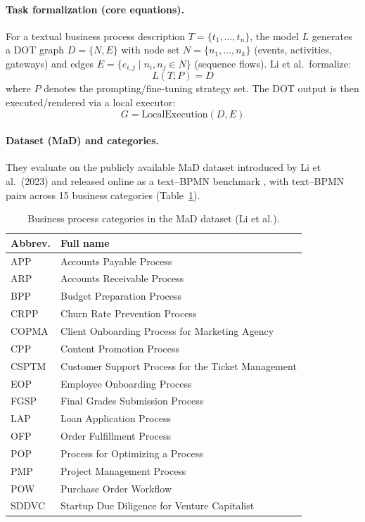 \paragraph{Task formalization (core equations).}
For a textual business process description $T=\{t_1,\dots,t_n\}$, the model $L$ generates a DOT graph
$D=\{N,E\}$ with node set $N=\{n_1,\dots,n_k\}$ (events, activities, gateways) and edges
$E=\{e_{i,j}\mid n_i,n_j\in N\}$ (sequence flows). Li et al.\ formalize: \cite{li-etal-2025-llm-based-business}
\begin{equation}
L(T;P)=D
\end{equation}
where $P$ denotes the prompting/fine-tuning strategy set. The DOT output is then executed/rendered via a local executor:
\begin{equation}
G=\mathrm{LocalExecution}(D,E)
\end{equation}

\paragraph{Dataset (MaD) and categories.}
They evaluate on the publicly available MaD dataset introduced by Li et al.\ (2023)
and released online as a text--BPMN benchmark \cite{li-etal-2023-mad,li-etal-2023-mad-data},
with text--BPMN pairs across 15 business categories (Table~\ref{tab:li2025-mad-categories}). \cite{li-etal-2025-llm-based-business}


\begin{table}[t]
\centering
\small
\setlength{\tabcolsep}{5pt}
\renewcommand{\arraystretch}{1.12}
\begin{tabular}{@{}ll@{}}
\toprule
\textbf{Abbrev.} & \textbf{Full name} \\
\midrule
APP   & Accounts Payable Process \\
ARP   & Accounts Receivable Process \\
BPP   & Budget Preparation Process \\
CRPP  & Churn Rate Prevention Process \\
COPMA & Client Onboarding Process for Marketing Agency \\
CPP   & Content Promotion Process \\
CSPTM & Customer Support Process for the Ticket Management \\
EOP   & Employee Onboarding Process \\
FGSP  & Final Grades Submission Process \\
LAP   & Loan Application Process \\
OFP   & Order Fulfillment Process \\
POP   & Process for Optimizing a Process \\
PMP   & Project Management Process \\
POW   & Purchase Order Workflow \\
SDDVC & Startup Due Diligence for Venture Capitalist \\
\bottomrule
\end{tabular}
\caption{Business process categories in the MaD dataset (Li et al.).}
\label{tab:li2025-mad-categories}
\end{table}


